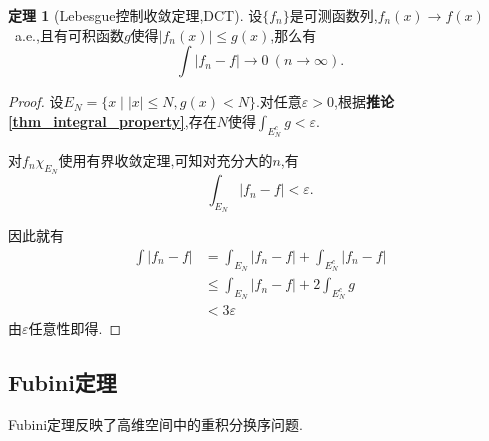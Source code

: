 \documentclass{ctexart}
\theoremstyle{definition}
\newtheorem{theorem}{定理}
\theoremstyle{remark}
\begin{document}
	\begin{theorem}[Lebesgue控制收敛定理,DCT]
		设$\{f_n\}$是可测函数列,$f_n(x)\to f(x)$\ a.e.,且有可积函数$g$使得$|f_n(x)|\le g(x)$,那么有
		$$\int{|f_n-f|}\to 0\ (n\to\infty).$$
	\end{theorem}
	\begin{proof}
		设$E_N=\{x\mid |x|\le N,g(x)<N\}$.对任意$\varepsilon>0$,根据\textbf{推论\ref{thm_integral_property}},存在$N$使得$\int_{E_N^c}{g}<\varepsilon$.
		
		对$f_n\chi_{E_N}$使用有界收敛定理,可知对充分大的$n$,有
		$$\int_{E_N}{|f_n-f|}<\varepsilon.$$
		
		因此就有
		\begin{align*}
			\int{|f_n-f|} & = \int_{E_N}{|f_n-f|}+\int_{E_N^c}{|f_n-f|} \\
			& \le \int_{E_N}{|f_n-f|}+2\int_{E_N^c}{g} \\
			& < 3\varepsilon
		\end{align*}
		由$\varepsilon$任意性即得.
	\end{proof}
	
	\subsection{Fubini定理}
	Fubini定理反映了高维空间中的重积分换序问题.
	
\end{document}
